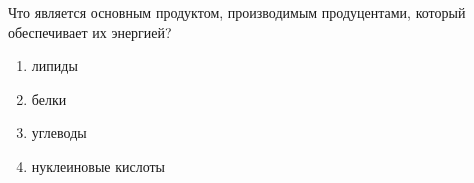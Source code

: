 
Что
является основным продуктом, производимым продуцентами, который обеспечивает их
энергией?

\begin{enumerate}
    \item липиды
    \item белки 
    \item углеводы 
    \item нуклеиновые кислоты
\end{enumerate}


\explanationSection

